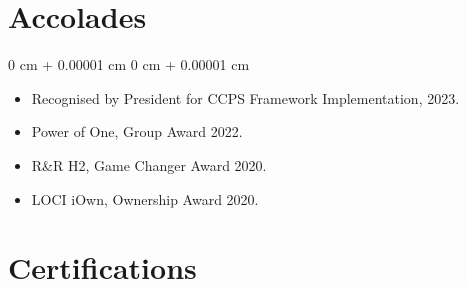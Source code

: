 \documentclass[10pt, letterpaper]{article}
\newenvironment{highlights}{
    \begin{itemize}[
        topsep=0.10 cm,
        parsep=0.10 cm,
        partopsep=0pt,
        itemsep=0pt,
        leftmargin=0 cm + 10pt
    ]
}{
    \end{itemize}
} %
\newenvironment{onecolentry}{
    \begin{adjustwidth}{
        0 cm + 0.00001 cm
    }{
        0 cm + 0.00001 cm
    }
}{
    \end{adjustwidth}
} %
\newenvironment{twocolentry}[2][]{
    \onecolentry
    \def\secondColumn{#2}
    \setcolumnwidth{\fill, 4.5 cm}
    \begin{paracol}{2}
}{
    \switchcolumn \raggedleft \secondColumn
    \end{paracol}
    \endonecolentry
} %
\begin{document}



    \section{\textbf{Accolades}}



        

        \begin{onecolentry}
            \begin{highlights}
                \item 
Recognised by President for CCPS Framework Implementation, 2023.
                \item Power of One, Group Award 2022.
                                \item 

R\&R H2, Game Changer Award 2020.
                \item 
LOCI iOwn, Ownership Award 2020. 
            \end{highlights}
        \end{onecolentry}

    \section{\textbf{\textbf{Certifications}}}



        
\end{document}
